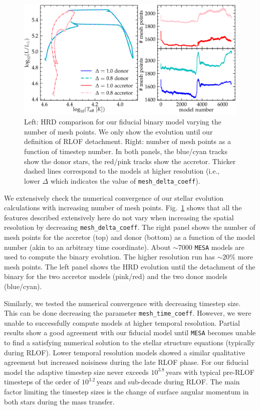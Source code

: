 \documentclass[twocolumn,twocolappendix,trackchanges]{aastex63}
\DeclareRobustCommand{\Figref}[1]{Fig.~\ref{#1}}
\begin{document}
\begin{figure}[hp]
  \centering
  \includegraphics[width=\textwidth]{spatial_res_plot}
  \caption{Left: HRD comparison for our fiducial binary model varying
  the number of mesh points. We only show the evolution until our definition
  of RLOF detachment. Right: number of mesh points as a
  function of timestep number. In both panels, the blue/cyan tracks show the donor stars, the
red/pink tracks show the accretor. Thicker dashed lines correspond to
the models at higher resolution (i.e., lower $\Delta$ which indicates
the value of \texttt{mesh\_delta\_coeff}).}
\label{fig:sp_test}
\end{figure}



We extensively check the numerical convergence of our stellar
evolution calculations with increasing number of mesh
points. \Figref{fig:sp_test} shows that all the features described
extensively here do not vary when increasing the spatial resolution by
decreasing \texttt{mesh\_delta\_coeff}. The right panel shows the
number of mesh points for the accretor (top) and donor (bottom) as a
function of the model number (akin to an arbitrary time
coordinate). About $\sim$7000 \texttt{MESA} models are used to compute
the binary evolution. The higher resolution run has $\sim 20\%$ more
mesh points. The left panel shows the HRD evolution until the
detachment of the binary for the two accretor models (pink/red) and
the two donor models (blue/cyan).

Similarly, we tested the numerical convergence with decreasing
timestep size. This can be done decreasing the parameter
\texttt{mesh\_time\_coeff}. However, we were unable to successfully
compute models at higher temporal resolution. Partial results show a
good agreement with our fiducial model until \texttt{MESA} becomes
unable to find a satisfying numerical solution to the stellar
structure equations (typically
during RLOF). Lower temporal resolution models showed a similar
qualitative agreement but increased noisiness during the late RLOF
phase. For our fiducial model the adaptive timestep size never exceeds
$10^{3.8}$\,years with typical pre-RLOF timesteps of the order of $10^{3.2}$\,years
and sub-decade during RLOF. The main factor limiting the timestep
sizes is the change of surface angular momentum in both stars during
the mass transfer.


\newpage


\end{document}
